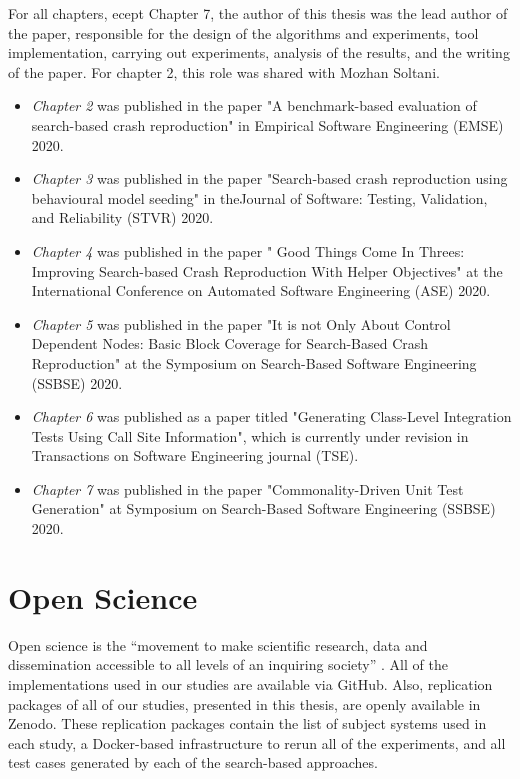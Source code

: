 For all chapters, ecept Chapter 7, the author of this thesis was the lead author of the paper, responsible for the design of the algorithms and experiments, tool implementation, carrying out experiments, analysis of the results, and the writing of the paper. For chapter 2, this role was shared with Mozhan Soltani.

\begin{itemize}
    \item \textit{Chapter 2} was published in the paper "A benchmark-based evaluation of search-based crash reproduction" in Empirical Software Engineering (EMSE) 2020.
    \item \textit{Chapter 3} was published in the paper "Search‐based crash reproduction using behavioural model seeding" in theJournal of Software: Testing, Validation, and Reliability (STVR) 2020.
    \item \textit{Chapter 4} was published in the paper " Good Things Come In Threes: Improving Search-based Crash Reproduction With Helper Objectives" at the International Conference on Automated Software Engineering (ASE) 2020.
    \item \textit{Chapter 5} was published in the paper "It is not Only About Control Dependent Nodes: Basic Block Coverage for Search-Based Crash Reproduction" at the Symposium on Search-Based Software Engineering (SSBSE) 2020.
    \item \textit{Chapter 6} was published as a paper titled "Generating Class-Level Integration Tests Using Call Site Information", which is currently under revision in Transactions on Software Engineering journal (TSE).
    \item \textit{Chapter 7} was published in the paper "Commonality-Driven Unit Test Generation" at Symposium on Search-Based Software Engineering (SSBSE) 2020.
  \end{itemize}

\section{Open Science}
\label{sec:intro:open}
Open science is the “movement to make scientific research, data and dissemination accessible to all levels of an inquiring society” \cite{Open_science}. All of the implementations used in our studies are available via GitHub. Also, replication packages of all of our studies, presented in this thesis, are openly available in Zenodo. These replication packages contain the list of subject systems used in each study, a Docker-based infrastructure to rerun all of the experiments, and all test cases generated by each of the search-based approaches.

